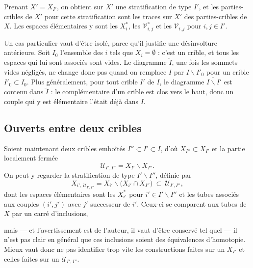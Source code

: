 \documentclass[11pt,a4paper]{article}
\begin{document}
Prenant $X' = X_{I'}$, on obtient sur $X'$ une stratification de type $I'$, et
les parties-cribles de $X'$ pour cette stratification sont les traces sur $X'$
des parties-cribles de $X$. Les espaces élémentaires y sont les $X_{i}^{*}$, les
$\mathcal{V}^{*}_{i,j}$ et les $\mathcal{V}_{i,j}$ pour $i,j \in I'$.

Un cas particulier vaut d'être isolé, parce qu'il justifie une désinvolture
antérieure. Soit $I_{0}$ l'ensemble des $i$ tels que $X_{i} = \emptyset$ : c'est
un crible, et tous les espaces qui lui sont associés sont vides. Le diagramme
$\widetilde{I}$, une fois les sommets vides négligés, ne change donc pas quand on
remplace $I$ par $I \smallsetminus I'_{0}$ pour un crible $I'_{0} \subset I_{0}$.
Plus généralement, pour tout crible $I'$ de $I$, le diagramme
$\widetilde{I \smallsetminus I'}$ est contenu dans $\widetilde{I}$ : le
complémentaire d'un crible est clos vers le haut, donc un couple qui y est
élémentaire l'était déjà dans $I$.

\subsection*{Ouverts entre deux cribles}

Soient maintenant deux cribles emboîtés $I'' \subset I' \subset I$, d'où
$X_{I''} \subset X_{I'}$ et la partie localement fermée
\[
  \mathcal{U}_{I',I''} = X_{I'} \smallsetminus X_{I''}.
\]
On peut y regarder la stratification de type $I' \smallsetminus I''$, définie par
\[
  X_{i',\,\mathcal{U}_{I',I''}}
  = X_{i'} \smallsetminus \bigl(X_{i'} \cap X_{I''}\bigr)
  \ \subset \ \mathcal{U}_{I',I''},
\]
dont les espaces élémentaires sont les $X_{i'}^{*}$ pour
$i' \in I' \smallsetminus I''$ et les tubes associés aux couples $(i',j')$ avec
$j'$ successeur de $i'$. Ceux-ci se comparent aux tubes de $X$ par un carré
d'inclusions,


mais — et l'avertissement est de l'auteur, il vaut d'être conservé tel quel —
il n'est pas clair en général que ces inclusions soient des équivalences
d'homotopie. Mieux vaut donc ne pas identifier trop vite les constructions faites
sur un $X_{I'}$ et celles faites sur un $\mathcal{U}_{I',I''}$.
\end{document}
